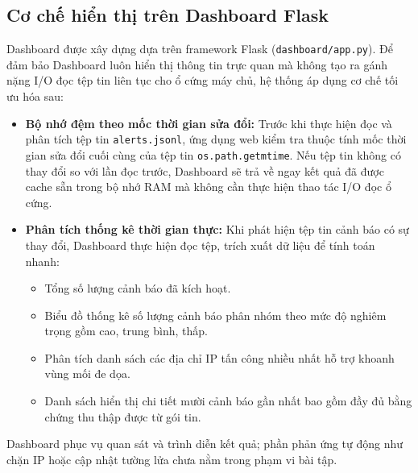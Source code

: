 \subsection{Cơ chế hiển thị trên Dashboard Flask}
Dashboard được xây dựng dựa trên framework Flask (\texttt{dashboard/app.py}). Để đảm bảo Dashboard luôn hiển thị thông tin trực quan mà không tạo ra gánh nặng I/O đọc tệp tin liên tục cho ổ cứng máy chủ, hệ thống áp dụng cơ chế tối ưu hóa sau:
\begin{itemize}
    \item \textbf{Bộ nhớ đệm theo mốc thời gian sửa đổi:} Trước khi thực hiện đọc và phân tích tệp tin \texttt{alerts.jsonl}, ứng dụng web kiểm tra thuộc tính mốc thời gian sửa đổi cuối cùng của tệp tin \texttt{os.path.getmtime}. Nếu tệp tin không có thay đổi so với lần đọc trước, Dashboard sẽ trả về ngay kết quả đã được cache sẵn trong bộ nhớ RAM mà không cần thực hiện thao tác I/O đọc ổ cứng.
    \item \textbf{Phân tích thống kê thời gian thực:} Khi phát hiện tệp tin cảnh báo có sự thay đổi, Dashboard thực hiện đọc tệp, trích xuất dữ liệu để tính toán nhanh:
    \begin{itemize}
        \item Tổng số lượng cảnh báo đã kích hoạt.
        \item Biểu đồ thống kê số lượng cảnh báo phân nhóm theo mức độ nghiêm trọng gồm cao, trung bình, thấp.
        \item Phân tích danh sách các địa chỉ IP tấn công nhiều nhất hỗ trợ khoanh vùng mối đe dọa.
        \item Danh sách hiển thị chi tiết mười cảnh báo gần nhất bao gồm đầy đủ bằng chứng thu thập được từ gói tin.
    \end{itemize}
\end{itemize}
Dashboard phục vụ quan sát và trình diễn kết quả; phần phản ứng tự động như chặn IP hoặc cập nhật tường lửa chưa nằm trong phạm vi bài tập.
